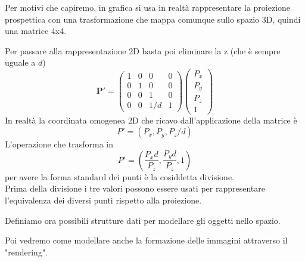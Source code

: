 \documentclass[a4paper, 10pt]{article}
\renewcommand{\vec}{\bm}
\begin{document}
		\newpage
		Per motivi che capiremo, in grafica si usa in realtà
		rappresentare la proiezione prospettica con una
		trasformazione che mappa comunque sullo spazio 3D, quindi
		una matrice 4x4.
		
		\noindent
		Per passare alla rappresentazione 2D basta poi eliminare la z
		(che è sempre uguale a $ d $)
		\[
			\vec{P'} =
			\begin{pmatrix}
				1 & 0 & 0 & 0 \\
				0 & 1 & 0 & 0 \\
				0 & 0 & 1 & 0 \\
				0 & 0 & 1/d & 1
			\end{pmatrix}
			\begin{pmatrix}
				P_x \\
				P_y \\
				P_z \\
				1
			\end{pmatrix}
		\]
		In realtà la coordinata omogenea 2D che ricavo 
		dall'applicazione della matrice è 
		\[
			P' = (P_x, P_y ,P_z/d) 
		\]
		L'operazione che trasforma in 
		\[
			P' = (\dfrac{P_x d}{P_z}, \dfrac{P_y d}{P_z} ,1)	
		\]
		per avere la forma standard dei punti è la cosiddetta divisione.\\
		Prima della divisione i tre valori possono essere usati per
		rappresentare l'equivalenza dei diversi punti rispetto alla
		proiezione.
		
		\noindent
		Definiamo ora possibili strutture dati per modellare gli oggetti
		nello spazio.
		
		\noindent
		Poi vedremo come modellare anche la formazione delle
		immagini attraverso il "rendering".
		
\end{document}
